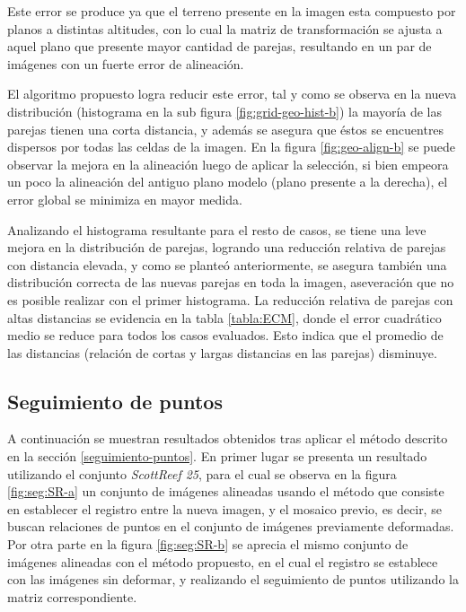 Este error se produce ya que el terreno presente en la imagen esta compuesto por planos a distintas altitudes, con lo cual la matriz de transformación se ajusta a aquel plano que presente mayor cantidad de parejas, resultando en un par de imágenes con un fuerte error de alineación. 

El algoritmo propuesto logra reducir este error, tal y como se observa en la nueva distribución (histograma en la sub figura \ref{fig:grid-geo-hist-b}) la mayoría de las parejas tienen una corta distancia, y además se asegura que éstos se encuentres dispersos por todas las celdas de la imagen. En la figura \ref{fig:geo-align-b} se puede observar la mejora en la alineación luego de aplicar la selección, si bien empeora un poco la alineación del antiguo plano modelo (plano presente a la derecha), el error global se minimiza en mayor medida. 

Analizando el histograma resultante para el resto de casos, se tiene una leve mejora en la distribución de parejas, logrando una reducción relativa de parejas con distancia elevada, y como se planteó anteriormente, se asegura también una distribución correcta de las nuevas parejas en toda la imagen, aseveración que no es posible realizar con el primer histograma. La reducción relativa de parejas con altas distancias se evidencia en la tabla \ref{tabla:ECM}, donde el error cuadrático medio se reduce para todos los casos evaluados. Esto indica que el promedio de las distancias (relación de cortas y largas distancias en las parejas) disminuye.

\subsection*{Seguimiento de puntos}

A continuación se muestran resultados obtenidos tras aplicar el método descrito en la sección \ref{seguimiento-puntos}. En primer lugar se presenta un resultado utilizando el conjunto \textit{ScottReef 25}, para el cual se observa en la figura \ref{fig:seg:SR-a} un conjunto de imágenes alineadas usando el método que consiste en establecer el registro entre la nueva imagen, y el mosaico previo, es decir, se buscan relaciones de puntos en el conjunto de imágenes previamente deformadas. Por otra parte en la figura \ref{fig:seg:SR-b} se aprecia el mismo conjunto de imágenes alineadas con el método propuesto, en el cual el registro se establece con las imágenes sin deformar, y realizando el seguimiento de puntos utilizando la matriz correspondiente.

